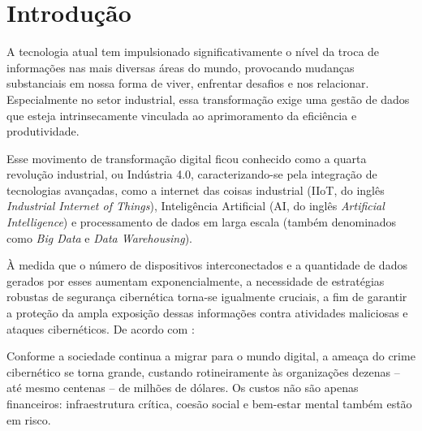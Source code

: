 

\chapter[Introdução]{Introdução} \label{cap:introducao}

    A tecnologia atual tem impulsionado significativamente o nível da troca de informações nas mais diversas áreas do mundo, provocando mudanças substanciais em nossa forma de viver, enfrentar desafios e nos relacionar. Especialmente no setor industrial, essa transformação exige uma gestão de dados que esteja intrinsecamente vinculada ao aprimoramento da eficiência e produtividade.
    
    Esse movimento de transformação digital ficou conhecido como a quarta revolução industrial, ou Indústria 4.0, caracterizando-se pela integração de tecnologias avançadas, como a internet das coisas industrial (IIoT, do inglês \textit{Industrial Internet of Things}), Inteligência Artificial (AI, do inglês \textit{Artificial Intelligence}) e processamento de dados em larga escala (também denominados como \textit{Big Data} e \textit{Data Warehousing}).
    
    À medida que o número de dispositivos interconectados e a quantidade de dados gerados por esses aumentam exponencialmente, a necessidade de estratégias robustas de segurança cibernética torna-se igualmente cruciais, a fim de garantir a proteção da ampla exposição dessas informações contra atividades maliciosas e ataques cibernéticos. De acordo com :
    
    \begin{citacao}
        Conforme a sociedade continua a migrar para o mundo digital, a ameaça do crime cibernético se torna grande, custando rotineiramente às organizações dezenas -- até mesmo centenas -- de milhões de dólares. Os custos não são apenas financeiros: infraestrutura crítica, coesão social e bem-estar mental também estão em risco.
    \end{citacao}

